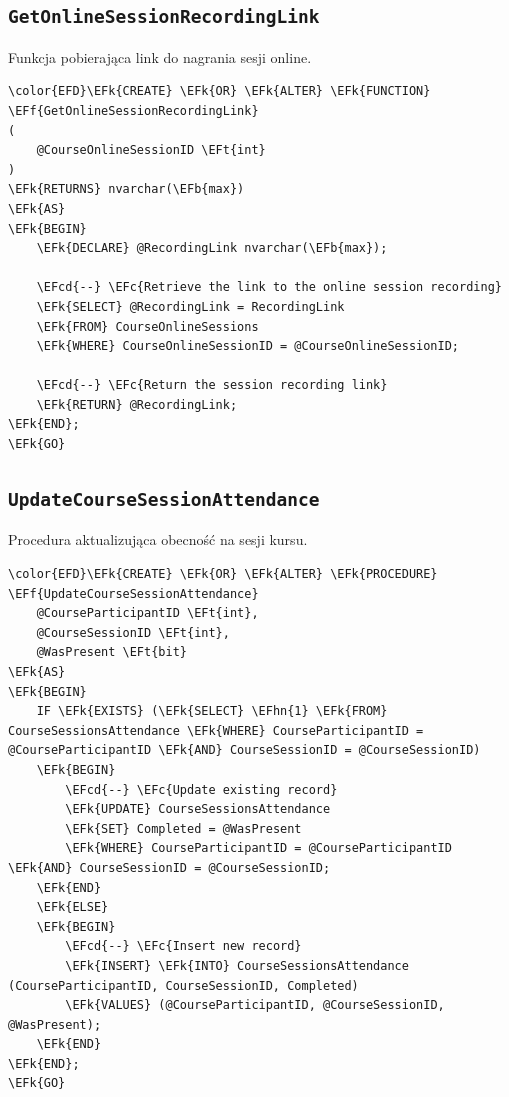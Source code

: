 \documentclass[11pt]{article}
\newcommand{\EFc}[1]{\textcolor{EFc}{\textit{#1}}} %
\newcommand{\EFcd}[1]{\textcolor{EFcd}{\textit{#1}}} %
\newcommand{\EFk}[1]{\textcolor{EFk}{\textbf{#1}}} %
\newcommand{\EFb}[1]{\textcolor{EFb}{\textbf{#1}}} %
\newcommand{\EFf}[1]{\textcolor{EFf}{#1}} %
\newcommand{\EFt}[1]{\textcolor{EFt}{\textbf{#1}}} %
\newcommand{\EFhn}[1]{\textcolor{EFhn}{#1}} %
\begin{document}
\subsection{\texttt{GetOnlineSessionRecordingLink}}
\label{sec:org8ed7012}
Funkcja pobierająca link do nagrania sesji online.
\begin{Code}
\begin{Verbatim}
\color{EFD}\EFk{CREATE} \EFk{OR} \EFk{ALTER} \EFk{FUNCTION} \EFf{GetOnlineSessionRecordingLink}
(
    @CourseOnlineSessionID \EFt{int}
)
\EFk{RETURNS} nvarchar(\EFb{max})
\EFk{AS}
\EFk{BEGIN}
    \EFk{DECLARE} @RecordingLink nvarchar(\EFb{max});

    \EFcd{--} \EFc{Retrieve the link to the online session recording}
    \EFk{SELECT} @RecordingLink = RecordingLink 
    \EFk{FROM} CourseOnlineSessions 
    \EFk{WHERE} CourseOnlineSessionID = @CourseOnlineSessionID;

    \EFcd{--} \EFc{Return the session recording link}
    \EFk{RETURN} @RecordingLink;
\EFk{END};
\EFk{GO}
\end{Verbatim}
\end{Code}
\subsection{\texttt{UpdateCourseSessionAttendance}}
\label{sec:org8f4378b}
Procedura aktualizująca obecność na sesji kursu.
\begin{Code}
\begin{Verbatim}
\color{EFD}\EFk{CREATE} \EFk{OR} \EFk{ALTER} \EFk{PROCEDURE} \EFf{UpdateCourseSessionAttendance}
    @CourseParticipantID \EFt{int},
    @CourseSessionID \EFt{int},
    @WasPresent \EFt{bit}
\EFk{AS}
\EFk{BEGIN}
    IF \EFk{EXISTS} (\EFk{SELECT} \EFhn{1} \EFk{FROM} CourseSessionsAttendance \EFk{WHERE} CourseParticipantID = @CourseParticipantID \EFk{AND} CourseSessionID = @CourseSessionID)
    \EFk{BEGIN}
        \EFcd{--} \EFc{Update existing record}
        \EFk{UPDATE} CourseSessionsAttendance
        \EFk{SET} Completed = @WasPresent
        \EFk{WHERE} CourseParticipantID = @CourseParticipantID \EFk{AND} CourseSessionID = @CourseSessionID;
    \EFk{END}
    \EFk{ELSE}
    \EFk{BEGIN}
        \EFcd{--} \EFc{Insert new record}
        \EFk{INSERT} \EFk{INTO} CourseSessionsAttendance (CourseParticipantID, CourseSessionID, Completed)
        \EFk{VALUES} (@CourseParticipantID, @CourseSessionID, @WasPresent);
    \EFk{END}
\EFk{END};
\EFk{GO}
\end{Verbatim}
\end{Code}
\end{document}
